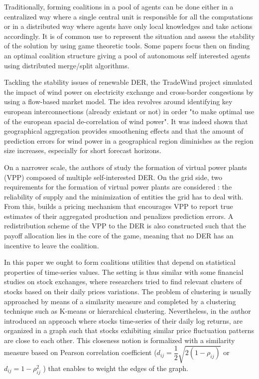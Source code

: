 \documentclass[conference]{IEEEtran}
\begin{document}
Traditionally, forming coalitions in a pool of agents can be done either in a centralized way where a single central unit is responsible for all the computations or in a distributed way where agents have only local knowledges and take actions accordingly. It is of common use to represent the situation and assess the stability of the solution by using game theoretic tools. Some papers \cite{Saad2009} \cite{Luan2014} focus then on finding an optimal coalition structure giving a pool of autonomous self interested agents using distributed merge/split algorithms.

Tackling the stability issues of renewable DER, the TradeWind project \cite{Europe} simulated the impact of wind power on electricity exchange and cross-border congestions by using a flow-based market model. The idea revolves around identifying key european interconnections (already existant or not) in order "to make optimal use of the european spacial de-correlation of wind power". It was indeed shown that geographical aggregation provides smoothening effects and that the amount of prediction errors for wind power in a geographical region diminishes as the region size increases, especially for short forecast horizons.

On a narrower scale, the authors of \cite{Kota2011} study the formation of virtual power plants (VPP) composed of multiple self-interested DER. On the grid side, two requirements for the formation of virtual power plants are considered : the reliability of supply and the minimization of entities the grid has to deal with. From this, \cite{Kota2011} builds a pricing mechanism that encourages VPP to report true estimates of their aggregated production and penalizes prediction errors. A redistribution scheme of the VPP to the DER is also constructed such that the payoff allocation lies in the core of the game, meaning that no DER has an incentive to leave the coalition.

In this paper we ought to form coalitions utilities that depend on statistical properties of time-series values. The setting is thus similar with some financial studies on stock exchanges, where researchers tried to find relevant clusters of stocks based on their daily prices variations. The problem of clustering is usually approached by means of a similarity measure and completed by a clustering technique such as K-means or hierarchical clustering. Nevertheless, in \cite{Mantegna1999} the author introduced an approach where stocks time-series of their daily log returns, are organized in a graph such that stocks exhibiting similar price fluctuation patterns are close to each other. This closeness notion is formalized with a similarity measure based on Pearson correlation coefficient ($ d_{ij} = \dfrac{1}{2}\sqrt{2(1-\rho_{ij})} $ or $ d_{ij} = 1 - \rho_{ij}^{2} $ ) that enables to weight the edges of the graph. 
\end{document}
